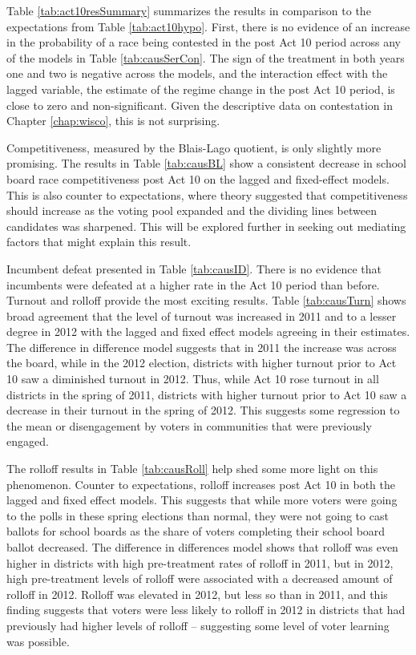 Table \ref{tab:act10resSummary} summarizes the results in comparison to the 
expectations from Table \ref{tab:act10hypo}. First, there is no evidence of an 
increase in the probability of a race being contested in the post Act 10 period 
across any of the models in Table \ref{tab:causSerCon}. The sign of the 
treatment in both years one and two is negative across the models, and the 
interaction effect with the lagged variable, the estimate of the regime change 
in the post Act 10 period, is close to zero and non-significant. Given the 
descriptive data on contestation in Chapter \ref{chap:wisco}, this 
is not surprising. 

Competitiveness, measured by the Blais-Lago quotient, is only slightly more 
promising. The results in Table \ref{tab:causBL} show a consistent decrease in 
school board race competitiveness post Act 10 on the lagged and fixed-effect 
models. This is also counter to expectations, 
where theory suggested that competitiveness should increase as the voting pool 
expanded and the dividing lines between candidates was sharpened. This will be 
explored further in seeking out mediating factors that might explain this result. 

Incumbent defeat presented in Table \ref{tab:causID}. There is no evidence 
that incumbents were defeated at a higher rate in the Act 10 period than before. 
Turnout and rolloff provide the most exciting results. Table \ref{tab:causTurn} 
shows broad agreement that the level of turnout was increased in 2011 and to a 
lesser degree in 2012 with the lagged and fixed effect models agreeing in their 
estimates. The difference in difference model suggests that in 2011 the increase 
was across the board, while in the 2012 election, districts with higher turnout 
prior to Act 10 saw a diminished turnout in 2012. Thus, while Act 10 rose turnout 
in all districts in the spring of 2011, districts with higher turnout prior to 
Act 10 saw a decrease in their turnout in the spring of 2012. This suggests some 
regression to the mean or disengagement by voters in communities that were previously 
engaged. 

The rolloff results in Table \ref{tab:causRoll} help shed some more light on this 
phenomenon. Counter to expectations, rolloff increases post Act 10 in both the 
lagged and fixed effect models. This suggests that while more voters were going 
to the polls in these spring elections than normal, they were not going to cast 
ballots for school boards as the share of voters completing their school board 
ballot decreased. The difference in differences model shows that rolloff was 
even higher in districts with high pre-treatment rates of rolloff in 2011, but 
in 2012, high pre-treatment levels of rolloff were associated with a decreased 
amount of rolloff in 2012. Rolloff was elevated in 2012, but less so than in 2011, 
and this finding suggests that voters were less likely to rolloff in 2012 in 
districts that had previously had higher levels of rolloff -- suggesting some 
level of voter learning was possible. 


